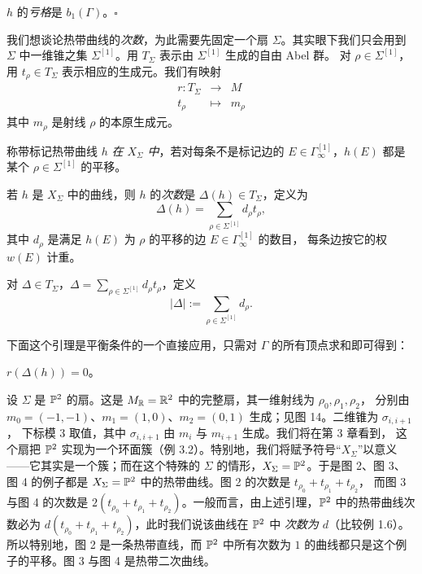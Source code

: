 $h$ 的\emph{亏格}是 $b_1(\Gamma)$。\hfill$\square$

我们想谈论热带曲线的\emph{次数}，为此需要先固定一个扇 $\Sigma$。其实眼下我们只会用到 $\Sigma$
中一维锥之集 $\Sigma^{[1]}$。用 $T_\Sigma$ 表示由 $\Sigma^{[1]}$ 生成的自由 Abel 群。
对 $\rho\in\Sigma^{[1]}$，用 $t_\rho\in T_\Sigma$ 表示相应的生成元。我们有映射
\[
  \begin{array}{rcl}
    r:T_\Sigma & \to & M\\
    t_\rho & \mapsto & m_\rho
  \end{array}
\]
其中 $m_\rho$ 是射线 $\rho$ 的本原生成元。

\begin{definition}
称带标记热带曲线 $h$ \emph{在 $X_\Sigma$ 中}，若对每条不是标记边的
$E\in\Gamma^{[1]}_\infty$，$h(E)$ 都是某个 $\rho\in\Sigma^{[1]}$ 的平移。

若 $h$ 是 $X_\Sigma$ 中的曲线，则 $h$ 的\emph{次数}是 $\Delta(h)\in T_\Sigma$，定义为
\[
  \Delta(h)=\sum_{\rho\in\Sigma^{[1]}}d_\rho t_\rho,
\]
其中 $d_\rho$ 是满足 $h(E)$ 为 $\rho$ 的平移的边 $E\in\Gamma^{[1]}_\infty$ 的数目，
每条边按它的权 $w(E)$ 计重。

对 $\Delta\in T_\Sigma$，$\Delta=\sum_{\rho\in\Sigma^{[1]}}d_\rho t_\rho$，定义
\[
  |\Delta|:=\sum_{\rho\in\Sigma^{[1]}}d_\rho .
\]
\end{definition}

下面这个引理是平衡条件的一个直接应用，只需对 $\Gamma$ 的所有顶点求和即可得到：

\begin{lemma}
$r(\Delta(h))=0$。
\end{lemma}

\begin{example}
设 $\Sigma$ 是 $\mathbb{P}^2$ 的扇。这是 $M_{\mathbb{R}}=\mathbb{R}^2$ 中的完整扇，其一维射线为 $\rho_0,\rho_1,\rho_2$，
分别由 $m_0=(-1,-1)$、$m_1=(1,0)$、$m_2=(0,1)$ 生成；见图 14。二维锥为 $\sigma_{i,i+1}$，
下标模 $3$ 取值，其中 $\sigma_{i,i+1}$ 由 $m_i$ 与 $m_{i+1}$ 生成。我们将在第 3 章看到，
这个扇把 $\mathbb{P}^2$ 实现为一个环面簇（例 3.2）。特别地，我们将赋予符号“$X_\Sigma$”以意义
——它其实是一个簇；而在这个特殊的 $\Sigma$ 的情形，$X_\Sigma=\mathbb{P}^2$。于是图 2、图 3、图 4
的例子都是 $X_\Sigma=\mathbb{P}^2$ 中的热带曲线。图 2 的次数是 $t_{\rho_0}+t_{\rho_1}+t_{\rho_2}$，
而图 3 与图 4 的次数是 $2(t_{\rho_0}+t_{\rho_1}+t_{\rho_2})$。一般而言，由上述引理，$\mathbb{P}^2$
中的热带曲线次数必为 $d(t_{\rho_0}+t_{\rho_1}+t_{\rho_2})$，此时我们说该曲线在 $\mathbb{P}^2$ 中
\emph{次数为 $d$}（比较例 1.6）。所以特别地，图 2 是一条热带直线，而 $\mathbb{P}^2$ 中所有次数为
$1$ 的曲线都只是这个例子的平移。图 3 与图 4 是热带二次曲线。
\end{example}

